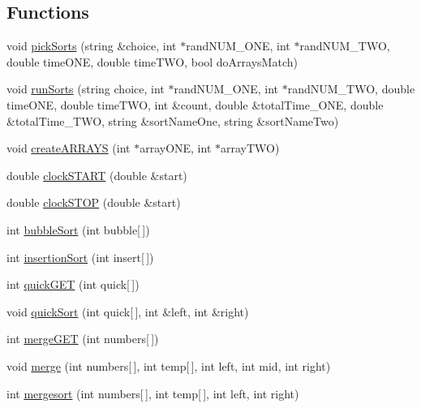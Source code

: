 \subsection*{Functions}
\begin{DoxyCompactItemize}
\item 
void \hyperlink{_delouth_mansfield-_assn4_8cpp_a37091112a4b3fb4a6b3e7e5a395bd888}{pickSorts} (string \&choice, int $\ast$randNUM\_\-ONE, int $\ast$randNUM\_\-TWO, double timeONE, double timeTWO, bool doArraysMatch)
\item 
void \hyperlink{_delouth_mansfield-_assn4_8cpp_ab8afa82cf87b47530bd2505812a9fc82}{runSorts} (string choice, int $\ast$randNUM\_\-ONE, int $\ast$randNUM\_\-TWO, double timeONE, double timeTWO, int \&count, double \&totalTime\_\-ONE, double \&totalTime\_\-TWO, string \&sortNameOne, string \&sortNameTwo)
\item 
void \hyperlink{_delouth_mansfield-_assn4_8cpp_a554ac789a02f1a6c2a1340d356ddf18a}{createARRAYS} (int $\ast$arrayONE, int $\ast$arrayTWO)
\item 
double \hyperlink{_delouth_mansfield-_assn4_8cpp_a06f37e9c6b6ed29e8670520afd7cb595}{clockSTART} (double \&start)
\item 
double \hyperlink{_delouth_mansfield-_assn4_8cpp_aac62ee236b316f39c25e76417c30c4e7}{clockSTOP} (double \&start)
\item 
int \hyperlink{_delouth_mansfield-_assn4_8cpp_a8bb793ac49cd588089713622d18a8c5b}{bubbleSort} (int bubble\mbox{[}$\,$\mbox{]})
\item 
int \hyperlink{_delouth_mansfield-_assn4_8cpp_abdd451b9bf57eb321b817db4405d65fd}{insertionSort} (int insert\mbox{[}$\,$\mbox{]})
\item 
int \hyperlink{_delouth_mansfield-_assn4_8cpp_a9c524d18ebb0b180ce26264cf9f01c33}{quickGET} (int quick\mbox{[}$\,$\mbox{]})
\item 
void \hyperlink{_delouth_mansfield-_assn4_8cpp_a9737d54cba3a8ffec81c622892328116}{quickSort} (int quick\mbox{[}$\,$\mbox{]}, int \&left, int \&right)
\item 
int \hyperlink{_delouth_mansfield-_assn4_8cpp_a5bf887ba10188a54f08008fba4edd364}{mergeGET} (int numbers\mbox{[}$\,$\mbox{]})
\item 
void \hyperlink{_delouth_mansfield-_assn4_8cpp_a22dd5c604dfcb67bc46bfd4bbb97d2f0}{merge} (int numbers\mbox{[}$\,$\mbox{]}, int temp\mbox{[}$\,$\mbox{]}, int left, int mid, int right)
\item 
int \hyperlink{_delouth_mansfield-_assn4_8cpp_a5f5d9f539f726c766f4c454c579f2f6d}{mergesort} (int numbers\mbox{[}$\,$\mbox{]}, int temp\mbox{[}$\,$\mbox{]}, int left, int right)

\end{DoxyCompactItemize}
